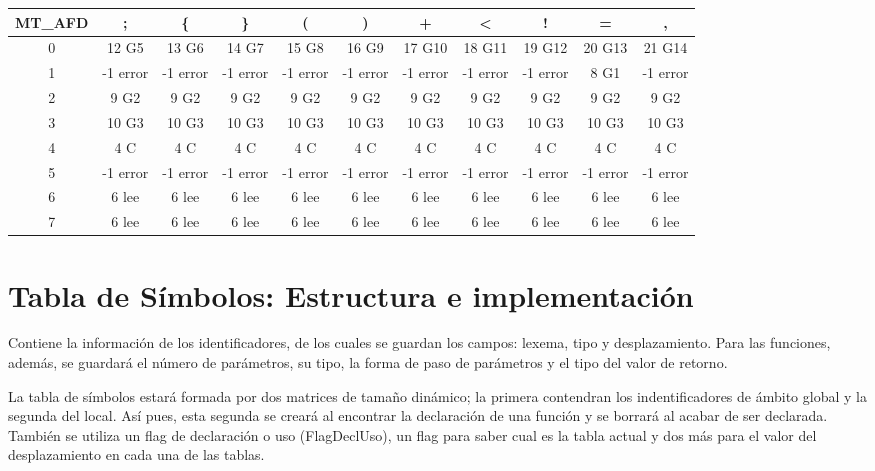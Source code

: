 \documentclass[a4paper, 12pt]{article}
\begin{document}
\hspace*{-70pt} \begin{tabular}{|c|c|c|c|c|c|c|c|c|c|c|}
\hline
    \textbf{MT\_AFD}    & \textbf{;}  & \textbf{\{}     & \textbf{\}}     & \textbf{(}     & \textbf{)}     & \textbf{+}     & \textbf{\textless}     & \textbf{!}     & \textbf{=}     & \textbf{,} \\
\hline
    0 & 12 G5 & 13 G6 & 14 G7 & 15 G8 & 16 G9 & 17 G10 & 18 G11 & 19 G12 & 20 G13 & 21 G14 \\
\hline
    1  & -1 error & -1 error & -1 error & -1 error & -1 error & -1 error & -1 error & -1 error & 8 G1  & -1 error \\
\hline
    2 & 9 G2 & 9 G2  & 9 G2  & 9 G2  & 9 G2  & 9 G2  & 9 G2  & 9 G2  & 9 G2  & 9 G2 \\
\hline
    3 & 10 G3 & 10 G3 & 10 G3 & 10 G3 & 10 G3 & 10 G3 & 10 G3 & 10 G3 & 10 G3 & 10 G3 \\
\hline
    4 & 4 C & 4 C   & 4 C   & 4 C   & 4 C   & 4 C   & 4 C   & 4 C   & 4 C   & 4 C \\
\hline
    5 & -1 error & -1 error & -1 error & -1 error & -1 error & -1 error & -1 error & -1 error & -1 error & -1 error \\
\hline
    6 & 6 lee & 6 lee & 6 lee & 6 lee & 6 lee & 6 lee & 6 lee & 6 lee & 6 lee & 6 lee \\
\hline
    7 & 6 lee & 6 lee & 6 lee & 6 lee & 6 lee & 6 lee & 6 lee & 6 lee & 6 lee & 6 lee \\
\hline
    \end{tabular}\hspace{-70pt}

    
\section{Tabla de Símbolos: Estructura e implementación}
Contiene la información de los identificadores, de los cuales se guardan los campos: lexema, tipo y desplazamiento.
Para las funciones, además, se guardará el número de parámetros, su tipo, la forma de paso de parámetros y el tipo del valor de retorno.

La tabla de símbolos estará formada por dos matrices de tamaño dinámico; la primera contendran los indentificadores de ámbito global y la segunda del local. Así pues, esta segunda se creará al encontrar la declaración de una función y se borrará al acabar de ser declarada. También se utiliza un flag de declaración o uso (FlagDeclUso), un flag para saber cual es la tabla actual y dos más para el valor del desplazamiento en cada una de las tablas.
\end{document}
